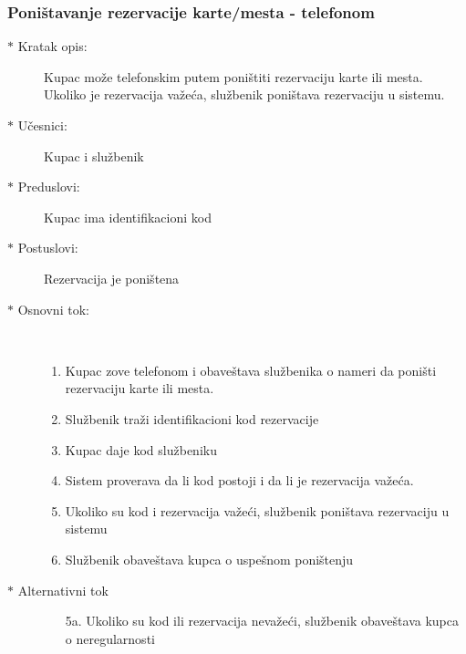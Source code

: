 \subsubsection{Poni\v stavanje rezervacije karte/mesta - telefonom}
\begin{description}
  \item[$\ast$ Kratak opis: ] Kupac mo\v ze telefonskim putem poni\v stiti rezervaciju karte ili mesta. Ukoliko je rezervacija va\v ze\'ca, slu\v zbenik poni\v stava rezervaciju u sistemu.
  \item[$\ast$ U\v cesnici: ] Kupac i slu\v zbenik
  \item[$\ast$ Preduslovi: ] Kupac ima identifikacioni kod
  \item[$\ast$ Postuslovi: ] Rezervacija je poni\v stena
  \item[$\ast$ Osnovni tok: ] \ \\
  \begin{enumerate}
    \item Kupac zove telefonom i obave\v stava slu\v zbenika o nameri da poni\v sti
	   rezervaciju karte ili mesta.
    \item Slu\v zbenik tra\v zi identifikacioni kod rezervacije
    \item Kupac daje kod slu\v zbeniku
    \item Sistem proverava da li kod postoji i da li je rezervacija va\v ze\'ca.
    \item Ukoliko su kod i rezervacija va\v ze\'ci, slu\v zbenik poni\v stava 
	   rezervaciju u sistemu
    \item Slu\v zbenik obave\v stava kupca o uspe\v snom poni\v stenju
  \end{enumerate}
  \item[$\ast$ Alternativni tok]
  \begin{enumerate}
    \item[5a. ]  Ukoliko su kod ili rezervacija neva\v ze\'ci, slu\v zbenik obave\v stava kupca o 
		neregularnosti
  \end{enumerate}
  
\end{description}

